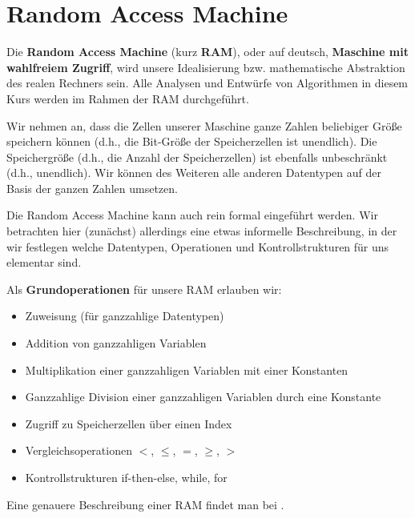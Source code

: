 \section{Random Access Machine}
\label{sect:RAM}

\begin{bem} 
Die \textbf{Random Access Machine} (kurz \textbf{RAM}), oder auf deutsch, \textbf{Maschine mit wahlfreiem Zugriff}, wird unsere Idealisierung bzw. mathematische Abstraktion des realen Rechners sein. Alle Analysen und Entwürfe von Algorithmen in diesem Kurs werden im Rahmen der RAM durchgeführt. 

Wir nehmen an, dass die Zellen unserer Maschine ganze Zahlen beliebiger Größe speichern können (d.h., die Bit-Größe der Speicherzellen ist unendlich). Die Speichergröße (d.h., die Anzahl der Speicherzellen) ist ebenfalls unbeschränkt (d.h., unendlich). Wir können des Weiteren alle anderen Datentypen auf der Basis der ganzen Zahlen umsetzen. 

Die Random Access Machine kann auch rein formal eingeführt werden. Wir betrachten hier (zunächst) allerdings eine etwas informelle Beschreibung, in der wir festlegen welche Datentypen, Operationen und Kontrollstrukturen für uns elementar sind. 

Als \textbf{Grundoperationen} für unsere RAM erlauben wir:
%
\begin{itemize}
	\item Zuweisung (für ganzzahlige Datentypen)
	\item Addition von ganzzahligen Variablen
	\item Multiplikation einer ganzzahligen Variablen mit einer Konstanten
	\item Ganzzahlige Division einer ganzzahligen Variablen durch eine Konstante
	\item Zugriff zu Speicherzellen über einen Index
	\item Vergleichsoperationen $<$, $\le$, $=$, $\ge$, $>$ 
	\item Kontrollstrukturen if-then-else, while, for 
\end{itemize}

Eine genauere Beschreibung einer RAM findet man bei \cite[Sect.~1.3]{Lov20}.
\end{bem} 


